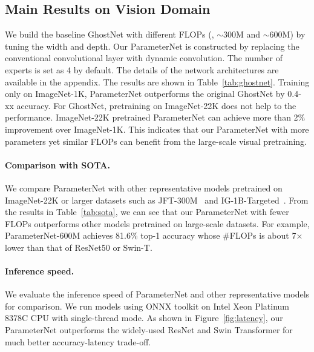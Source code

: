 \documentclass[10pt,twocolumn,letterpaper]{article}
\begin{document}
\subsection{Main Results on Vision Domain}
We build the baseline GhostNet with different FLOPs (\ie, $\sim$300M and $\sim$600M) by tuning the width and depth. Our ParameterNet is constructed by replacing the conventional convolutional layer with dynamic convolution. The number of experts is set as 4 by default. The details of the network architectures are available in the appendix. The results are shown in Table~\ref{tab:ghostnet}. Training only on ImageNet-1K, ParameterNet outperforms the original GhostNet by 0.4-xx accuracy. For GhostNet, pretraining on ImageNet-22K does not help to the performance. ImageNet-22K pretrained ParameterNet can achieve more than 2\% improvement over ImageNet-1K. This indicates that our ParameterNet with more parameters yet similar FLOPs can benefit from the large-scale visual pretraining.

\paragraph{Comparison with SOTA.}
We compare ParameterNet with other representative models pretrained on ImageNet-22K or larger datasets such as JFT-300M~\cite{sun2017revisiting} and IG-1B-Targeted~\cite{yalniz2019billion}. From the results in Table~\ref{tab:sota}, we can see that our ParameterNet with fewer FLOPs outperforms other models pretrained on large-scale datasets. For example, ParameterNet-600M achieves 81.6\% top-1 accuracy whose \#FLOPs is about 7$\times$ lower than that of ResNet50 or Swin-T.

\paragraph{Inference speed.}
We evaluate the inference speed of ParameterNet and other representative models for comparison. We run models using ONNX toolkit on Intel Xeon Platinum 8378C CPU with single-thread mode. As shown in Figure~\ref{fig:latency}, our ParameterNet outperforms the widely-used ResNet and Swin Transformer for much better accuracy-latency trade-off.
\end{document}
